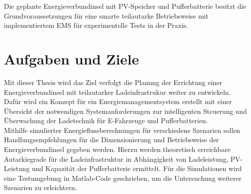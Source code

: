 		Die geplante Energieverbundinsel mit PV-Speicher und Pufferbatterie besitzt die Grundvoraussetzungen für eine smarte teilautarke Betriebsweise mit implementiertem \ac{EMS} für experimentelle Tests in der Praxis.


\section{Aufgaben und Ziele}
	Mit dieser Thesis wird das Ziel verfolgt die Planung der Errichtung einer Energieverbundinsel mit teilautarker Ladeinfrastrukur weiter zu entwickeln. Dafür wird ein Konzept für ein Energiemanagementsystem erstellt mit einer Übersicht der notwendigen Systemanforderungen zur intelligenten Steuerung und Überwachung der Ladetechnik für E-Fahrzeuge und Pufferbatterien.\\
	
	Mithilfe simulierter Energieflussberechnungen für verschiedene Szenarien sollen Handlungsempfehlungen für die Dimensionierung und Betriebsweise der Energieverbundinsel gegeben werden. Hierzu werden theoretisch erreichbare Autarkiegrade für die Ladeinfrastruktur in Abhängigkeit von Ladeleistung, PV-Leistung und Kapazität der Pufferbatterie ermittelt. Für die Simulationen wird eine Testumgebung in Matlab-Code geschrieben, um die Untersuchung weiterer Szenarien zu erleichtern. \\
	
	

